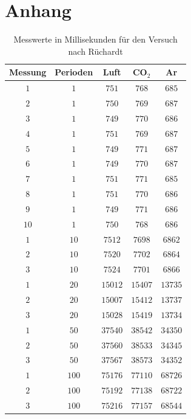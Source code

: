 \documentclass[12pt, a4paper, twoside]{scrartcl}
\begin{document}
\newpage
\section*{Anhang}

\begin{table} [H]
\centering
\begin{tabular}{|c|c||c|c|c|} \hline
    Messung & Perioden & Luft & CO$_2$ & Ar \\\hline
    $1 $&$ 1 $&$ 751 $&$ 768 $&$ 685$ \\
    $2 $&$ 1 $&$ 750 $&$ 769 $&$ 687$ \\
    $3 $&$ 1 $&$ 749 $&$ 770 $&$ 686$ \\
    $4 $&$ 1 $&$ 751 $&$ 769 $&$ 687$ \\
    $5 $&$ 1 $&$ 749 $&$ 771 $&$ 687$ \\
    $6 $&$ 1 $&$ 749 $&$ 770 $&$ 687$ \\
    $7 $&$ 1 $&$ 751 $&$ 771 $&$ 685$ \\
    $8 $&$ 1 $&$ 751 $&$ 770 $&$ 686$ \\
    $9 $&$ 1 $&$ 749 $&$ 771 $&$ 686$ \\
    $10 $&$ 1 $&$ 750 $&$ 768 $&$ 686$ \\
    \hline
    $1 $&$ 10 $&$ 7512 $&$ 7698 $&$ 6862$ \\
    $2 $&$ 10 $&$ 7520 $&$ 7702 $&$ 6864$ \\
    $3 $&$ 10 $&$ 7524 $&$ 7701 $&$ 6866$ \\
    \hline
    $1 $&$ 20 $&$ 15012 $&$ 15407 $&$ 13735$ \\
    $2 $&$ 20 $&$ 15007 $&$ 15412 $&$ 13737$ \\
    $3 $&$ 20 $&$ 15028 $&$ 15419 $&$ 13734$ \\
    \hline
    $1 $&$ 50 $&$ 37540 $&$ 38542 $&$ 34350$ \\
    $2 $&$ 50 $&$ 37560 $&$ 38533 $&$ 34345 $\\
    $3 $&$ 50 $&$ 37567 $&$ 38573 $&$ 34352 $\\
    \hline
    $1 $&$ 100 $&$ 75176 $&$ 77110 $&$ 68726$ \\
    $2 $&$ 100 $&$ 75192 $&$ 77138 $&$ 68722$ \\
    $3 $&$ 100 $&$ 75216 $&$ 77157 $&$ 68544$ \\
    \hline
 \end{tabular} 
 \caption{\label{tab:}Messwerte in Millisekunden für den Versuch nach Rüchardt}
\end{table}
\end{document}
